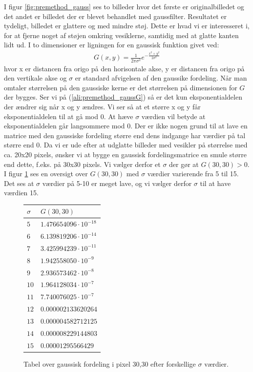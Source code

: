 I figur \ref{fig:premethod_gauss} ses to billeder hvor det første er originalbilledet og det andet er billedet der er blevet behandlet med gaussfilter. Resultatet er tydeligt, billedet er glattere og med mindre støj. Dette er hvad vi er interesseret i, for at fjerne noget af støjen omkring vesiklerne, samtidig med at glatte kanten lidt ud. I to dimensioner er ligningen for en gaussisk funktion givet ved: 
\begin{align}
	G(x,y) = \frac{1}{2\pi\sigma^2}e^{-\frac{x^2+y^2}{2\sigma^2}}\label{ali:premethod_gaussG}
\end{align}
hvor x er distancen fra origo på den horisontale akse, y er distancen fra origo på den vertikale akse og $\sigma$ er standard afvigelsen af den gaussike fordeling. Når man omtaler størrelsen på den gaussiske kerne er det størrelsen på dimensionen for $G$ der bygges. Ser vi på (\ref{ali:premethod_gaussG}) så er det kun eksponentialdelen der ændrer sig når x og y ændres. Vi ser så at et større x og y får eksponentialdelen til at gå mod 0. At hæve $\sigma$ værdien vil betyde at eksponentialdelen går langsommere mod 0. Der er ikke nogen grund til at lave en matrice med den gaussiske fordeling større end dens indgange har værdier på tal større end 0. Da vi er ude efter at udglatte billeder med vesikler på størrelse med ca. 20x20 pixels, ønsker vi at bygge en gaussisk fordelingsmatrice en smule 
større end dette, f.eks. på 30x30 pixels. Vi vælger derfor et $\sigma$ der gør at $G(30,30) > 0$. I figur \ref{fig:premethod_gauss_table} ses en oversigt over $G(30,30)$ med $\sigma$ værdier varierende fra 5 til 15. Det ses at $\sigma$ værdier på 5-10 er meget lave, og vi vælger derfor $\sigma$ til at have værdien 15.  
 
\begin{figure}[H]
	\centering
	\begin{tabular}{l | l}
			\textbf{$\sigma$} & $G(30,30)$\\
			\hline
			$5$ & $1.476654096\cdot10^{-18}$\\
			$6$ & $6.139819206\cdot10^{-14}$\\
			$7$ & $3.425994239\cdot10^{-11}$\\
			$8$ & $1.942558050\cdot10^{-9}$\\
			$9$ & $2.936573462\cdot10^{-8}$\\
			$10$ & $1.964128034\cdot10^{-7}$\\
			$11$ & $7.740076025\cdot10^{-7}$\\
			$12$ & $0.000002133620264$\\
			$13$ & $0.000004582712125$\\
			$14$ & $0.000008229144803$\\
			$15$ & $0.00001295566429$
	\end{tabular}
	\caption{Tabel over gaussisk fordeling i pixel 30,30 efter forskellige $\sigma$ værdier.\label{fig:premethod_gauss_table}}
\end{figure}

